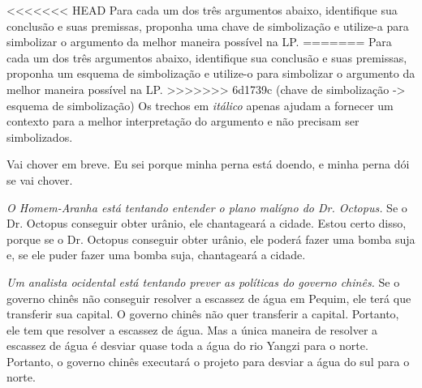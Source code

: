 \problempart
<<<<<<< HEAD
Para cada um dos três argumentos abaixo, identifique sua conclusão e suas premissas, proponha uma chave de simbolização e utilize-a para simbolizar o  argumento da melhor maneira possível na LP.
=======
Para cada um dos três argumentos abaixo, identifique sua conclusão e suas premissas, proponha um esquema de simbolização e utilize-o para simbolizar o  argumento da melhor maneira possível na LP.
>>>>>>> 6d1739c (chave de simbolização -> esquema de simbolização)
Os trechos em \emph{itálico} apenas ajudam a fornecer um contexto para a melhor interpretação do argumento e não precisam ser simbolizados.
\begin{earg}
\item Vai chover em breve. Eu sei porque minha perna está doendo, e minha perna dói se vai chover.



\item  \emph{O Homem-Aranha está tentando entender o plano malígno do Dr. Octopus.} Se o Dr. Octopus conseguir obter urânio, ele chantageará a cidade. Estou certo disso, porque se o Dr. Octopus conseguir obter urânio, ele poderá fazer uma bomba suja e, se ele puder fazer uma bomba suja, chantageará a cidade.



\item \emph{Um analista ocidental está tentando prever as políticas do governo chinês.} Se o governo chinês não conseguir resolver a escassez de água em Pequim, ele terá que transferir sua capital. O governo chinês não quer transferir a capital. Portanto, ele tem que resolver a escassez de água. Mas a única maneira de resolver a escassez de água é desviar quase toda a água do rio Yangzi para o norte. Portanto, o governo chinês executará o projeto para desviar a água do sul para o norte.       




\end{earg}
